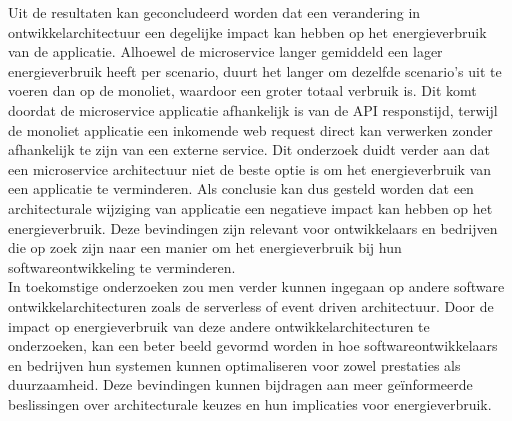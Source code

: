 Uit de resultaten kan geconcludeerd worden dat een verandering in ontwikkelarchitectuur een degelijke impact kan hebben op het energieverbruik van de applicatie. Alhoewel de microservice langer gemiddeld een lager energieverbruik heeft per scenario, duurt het langer om dezelfde scenario's uit te voeren dan op de monoliet, waardoor een groter totaal verbruik is. Dit komt doordat de microservice applicatie afhankelijk is van de API responstijd, terwijl de monoliet applicatie een inkomende web request direct kan verwerken zonder afhankelijk te zijn van een externe service. Dit onderzoek duidt verder aan dat een microservice architectuur niet de beste optie is om het energieverbruik van een applicatie te verminderen. Als conclusie kan dus gesteld worden dat een architecturale wijziging van applicatie een negatieve impact kan hebben op het energieverbruik. Deze bevindingen zijn relevant voor ontwikkelaars en bedrijven die op zoek zijn naar een manier om  het energieverbruik bij hun softwareontwikkeling te verminderen.\\

In toekomstige onderzoeken zou men verder kunnen ingegaan op andere software ontwikkelarchitecturen zoals de serverless of event driven architectuur. Door de impact op energieverbruik van deze andere ontwikkelarchitecturen te onderzoeken, kan een beter beeld gevormd worden in hoe softwareontwikkelaars en bedrijven hun systemen kunnen optimaliseren voor zowel prestaties als duurzaamheid. Deze bevindingen kunnen bijdragen aan meer geïnformeerde beslissingen over architecturale keuzes en hun implicaties voor energieverbruik.
